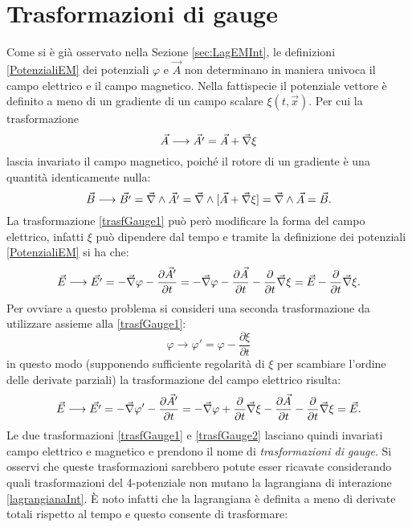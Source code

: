 \section{Trasformazioni di gauge}\label{sec:gauge}
Come si è già osservato nella Sezione \ref{sec:LagEMInt}, le definizioni \eqref{PotenzialiEM} dei potenziali $\varphi$ e $\vec A$ non determinano in maniera univoca il campo elettrico e il campo magnetico. Nella fattispecie il potenziale vettore è definito a meno di un gradiente di un campo scalare $\xi(t,\vec x)$. Per cui la trasformazione
\begin{equation}
     \vec{A}\longrightarrow\vec {A'}=\vec A + \vec{\nabla} \xi \label{trasfGauge1}
\end{equation}
lascia invariato il campo magnetico, poiché il rotore di un gradiente è una quantità identicamente nulla: 
\begin{equation*}
    \vec B\longrightarrow\vec{B'}=\vec{\nabla}\wedge\vec {A'}=\vec{\nabla}\wedge[\vec A + \vec{\nabla} \xi]=\vec{\nabla}\wedge\vec A =\vec B.
\end{equation*}
La trasformazione \eqref{trasfGauge1} può però modificare la forma del campo elettrico, infatti $\xi$ può dipendere dal tempo e tramite la definizione dei potenziali \eqref{PotenzialiEM} si ha che:
\begin{equation*}
    \vec E\longrightarrow\vec{E'}=-\vec{\nabla} \varphi-\frac{\partial\vec A'}{\partial t}=-\vec{\nabla} \varphi-\frac{\partial\vec A}{\partial t}-\frac{\partial}{\partial t}\vec{\nabla}\xi=\vec{E}-\frac{\partial}{\partial t}\vec{\nabla}\xi.
\end{equation*}
Per ovviare a questo problema si consideri una seconda trasformazione da utilizzare assieme alla \eqref{trasfGauge1}:
\begin{equation}
    \varphi \longrightarrow \varphi'=\varphi-\frac{\partial\xi}{\partial t}
    \label{trasfGauge2}
\end{equation}
in questo modo (supponendo sufficiente regolarità di $\xi$ per scambiare l'ordine delle derivate parziali) la trasformazione del campo elettrico risulta:
\begin{equation*}
    \vec E\longrightarrow\vec{E'}=-\vec{\nabla} \varphi'-\frac{\partial\vec A'}{\partial t}=-\vec{\nabla} \varphi+\frac{\partial}{\partial t}\vec{\nabla}\xi-\frac{\partial\vec A}{\partial t}-\frac{\partial}{\partial t}\vec{\nabla}\xi=\vec{E}.
\end{equation*}
Le due trasformazioni \eqref{trasfGauge1} e \eqref{trasfGauge2} lasciano quindi invariati campo elettrico e magnetico e prendono il nome di \emph{trasformazioni di gauge}. Si osservi che queste trasformazioni sarebbero potute esser ricavate considerando quali trasformazioni del 4-potenziale non mutano la lagrangiana di interazione \eqref{lagrangianaInt}. È noto infatti che la lagrangiana è definita a meno di derivate totali rispetto al tempo e questo consente di trasformare:
